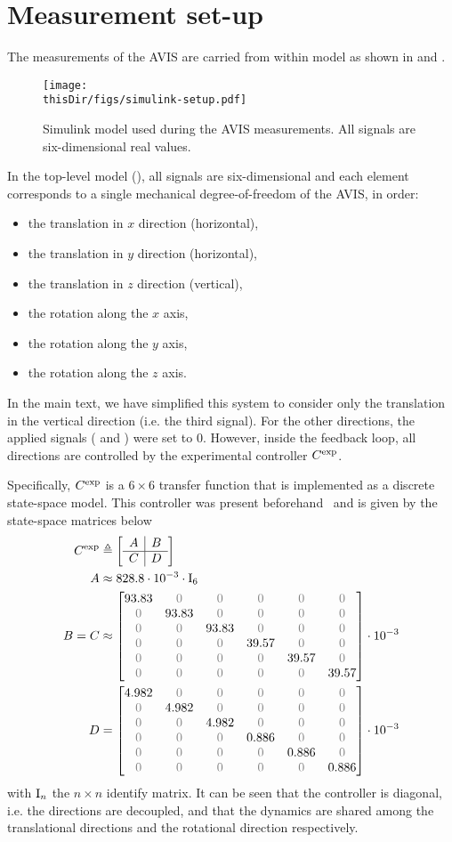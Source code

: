 
\section{Measurement set-up}
The measurements of the \gls{AVIS} are carried from within \Simulink model as shown in  and .

\begin{figure}
\setlength\figurewidth{\columnwidth}
  \texttt{[image: \\thisDir/figs/simulink-setup.pdf]}
  \caption{Simulink model used during the AVIS measurements. All signals are six-dimensional real values.}
  \label{fig:avis:simulink:setup}
\end{figure}

In the top-level model (), all signals are six-dimensional and each element corresponds to a single mechanical degree-of-freedom of the \gls{AVIS}, in order:
\begin{itemize}
  \item the translation in $x$ direction (horizontal),
  \item the translation in $y$ direction (horizontal),
  \item the translation in $z$ direction (vertical),
  \item the rotation along the $x$ axis,
  \item the rotation along the $y$ axis,
  \item the rotation along the $z$ axis.
\end{itemize}
In the main text, we have simplified this system to consider only the translation in the vertical direction (i.e. the third signal).
For the other directions, the applied signals ( and ) were set to $0$.
However, inside the feedback loop, all directions are controlled by the experimental controller $C^{\mathrm{exp}}$.

Specifically, $C^{\mathrm{exp}}$ is a $6\times6$ transfer function that is implemented as a discrete state-space model.
This controller was present beforehand~\citep{Rademakers2005MSc,vanderMaas2011MSc} and is given by the state-space matrices below
\begin{align}
  \experimental\Controller & \isdef \stateSpace{A}{B}{C}{D}\\
  A       &\approx 828.8 \cdot 10^{-3} \cdot \Identity{6} \\
  B = C &\approx \AvisMatrixDiagonal{93.83}{39.57} \cdot 10^{-3}\\
  D       &= \AvisMatrixDiagonal{4.982}{0.886} \cdot 10^{-3}
\end{align}
with $\mathrm{I}_{n}$ the $n\times n$ identify matrix.
It can be seen that the controller is diagonal, i.e. the directions are decoupled, and that the dynamics are shared among the translational directions and the rotational direction respectively.

